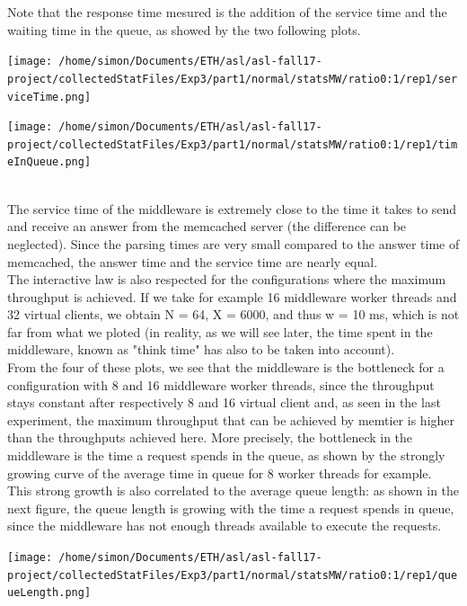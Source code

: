 \documentclass[11pt,a4paper]{article}
\begin{document}
Note that the response time mesured is the addition of the service time and the waiting time in the queue, as showed by the two following plots. 
\\
\begin{minipage}{0.5\linewidth}
\texttt{[image: /home/simon/Documents/ETH/asl/asl-fall17-project/collectedStatFiles/Exp3/part1/normal/statsMW/ratio0:1/rep1/serviceTime.png]}
\end{minipage}
\hfill
\begin{minipage}{0.5\linewidth}
\texttt{[image: /home/simon/Documents/ETH/asl/asl-fall17-project/collectedStatFiles/Exp3/part1/normal/statsMW/ratio0:1/rep1/timeInQueue.png]}
\end{minipage}
\\
The service time of the middleware is extremely close to the time it takes to send and receive an answer from the memcached server (the difference can be neglected). Since the parsing times are very small compared to the answer time of memcached, the answer time and the service time are nearly equal. 
\\
The interactive law is also respected for the configurations where the maximum throughput is achieved. If we take for example 16 middleware worker threads and 32 virtual clients, we obtain N = 64, X = 6000, and thus w = 10 ms, which is not far from what we ploted (in reality, as we will see later, the time spent in the middleware, known as "think time" has also to be taken into account). 
\\
From the four of these plots, we see that the middleware is the bottleneck for a configuration with 8 and 16 middleware worker threads, since the throughput stays constant after respectively 8 and 16 virtual client and, as seen in the last experiment, the maximum throughput that can be achieved by memtier is higher than the throughputs achieved here. More precisely, the bottleneck in the middleware is the time a request spends in the queue, as shown by the strongly growing curve of the average time in queue for 8 worker threads for example. This strong growth is also correlated to the average queue length: as shown in the next figure, the queue length is growing with the time a request spends in queue, since the middleware has not enough threads available to execute the requests. 
\begin{center}
\texttt{[image: /home/simon/Documents/ETH/asl/asl-fall17-project/collectedStatFiles/Exp3/part1/normal/statsMW/ratio0:1/rep1/queueLength.png]}
\end{center}
\end{document}
